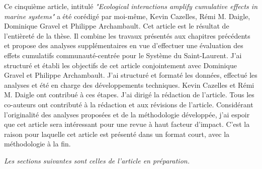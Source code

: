 Ce cinquième article, intitulé \textit{"Ecological interactions amplify cumulative effects in marine systems"} a été corédigé par moi-même, Kevin Cazelles, Rémi M. Daigle, Dominique Gravel et Philippe Archambault. Cet article est le résultat de l'entièreté de la thèse. Il combine les travaux présentés aux chapitres précédents et propose des analyses supplémentaires en vue d'effectuer une évaluation des effets cumulatifs communauté-centrée pour le Système du Saint-Laurent. J'ai structuré et établi les objectifs de cet article conjointement avec Dominique Gravel et Philippe Archambault. J'ai structuré et formaté les données, effectué les analyses et été en charge des développements techniques. Kevin Cazelles et Rémi M. Daigle ont contribué à ces étapes. J'ai dirigé la rédaction de l'article. Tous les co-auteurs ont contributé à la rédaction et aux révisions de l'article. Considérant l'originalité des analyses proposées et de la méthodologie développée, j'ai espoir que cet article sera intéressant pour une revue à haut facteur d'impact. C'est la raison pour laquelle cet article est présenté dans un format court, avec la méthodologie à la fin. \linebreak[4]


\textit{Les sections suivantes sont celles de l'article en préparation.}
